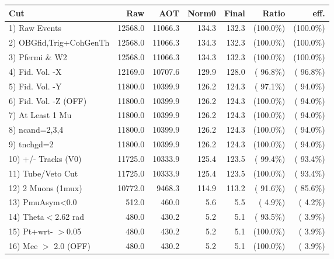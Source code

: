  \begin{table}[h!]\centering
 \begin{tabular}{||l||r|r|r|r|r|r||}
 \hline
 \hline
 Cut & Raw & AOT & Norm0 & Final & Ratio & eff.       \\
 \hline
  1) Raw Events           &      12568.0 &      11066.3 &        134.3 &        132.3 & (100.0\%) & (100.0\%) \\
  2) OBGfid,Trig+CohGenTh &      12568.0 &      11066.3 &        134.3 &        132.3 & (100.0\%) & (100.0\%) \\
  3) Pfermi \& W2         &      12568.0 &      11066.3 &        134.3 &        132.3 & (100.0\%) & (100.0\%) \\
  4) Fid. Vol. -X         &      12169.0 &      10707.6 &        129.9 &        128.0 & ( 96.8\%) & ( 96.8\%) \\
  5) Fid. Vol. -Y         &      11800.0 &      10399.9 &        126.2 &        124.3 & ( 97.1\%) & ( 94.0\%) \\
  6) Fid. Vol. -Z (OFF)   &      11800.0 &      10399.9 &        126.2 &        124.3 & (100.0\%) & ( 94.0\%) \\
  7) At Least 1 Mu        &      11800.0 &      10399.9 &        126.2 &        124.3 & (100.0\%) & ( 94.0\%) \\
  8) ncand=2,3,4          &      11800.0 &      10399.9 &        126.2 &        124.3 & (100.0\%) & ( 94.0\%) \\
  9) tnchgd=2             &      11800.0 &      10399.9 &        126.2 &        124.3 & (100.0\%) & ( 94.0\%) \\
 10) +/- Tracks (V0)      &      11725.0 &      10333.9 &        125.4 &        123.5 & ( 99.4\%) & ( 93.4\%) \\
 11) Tube/Veto Cut        &      11725.0 &      10333.9 &        125.4 &        123.5 & (100.0\%) & ( 93.4\%) \\
 12) 2 Muons (1mux)       &      10772.0 &       9468.3 &        114.9 &        113.2 & ( 91.6\%) & ( 85.6\%) \\
 13) PmuAsym<0.0          &        512.0 &        460.0 &          5.6 &          5.5 & (  4.9\%) & (  4.2\%) \\
 14) Theta$<$2.62 rad     &        480.0 &        430.2 &          5.2 &          5.1 & ( 93.5\%) & (  3.9\%) \\
 15) Pt+wrt- $>$0.05      &        480.0 &        430.2 &          5.2 &          5.1 & (100.0\%) & (  3.9\%) \\
 16) Mee $>$ 2.0  (OFF)   &        480.0 &        430.2 &          5.2 &          5.1 & (100.0\%) & (  3.9\%) \\

\end{tabular}
\end{table}
